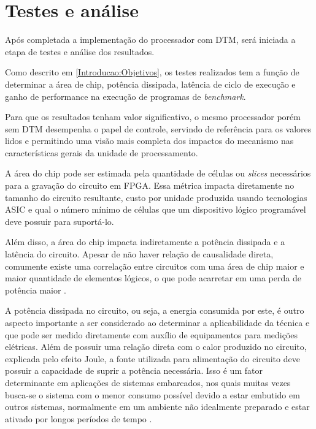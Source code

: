 \section{Testes e análise}
\label{Metodologia:Analise}

Após completada a implementação do processador com DTM, será iniciada a etapa de testes e análise dos resultados. 


Como descrito em \ref{Introducao:Objetivos}, os testes realizados tem a função de determinar a área de chip, potência dissipada, latência de ciclo de execução e ganho de performance na execução de programas de \textit{benchmark}. %

Para que os resultados tenham valor significativo, o mesmo processador porém sem DTM desempenha o papel de controle, servindo de referência para os valores lidos e permitindo uma visão mais completa dos impactos do mecanismo nas características gerais da unidade de processamento.

A área do chip pode ser estimada pela quantidade de células ou \textit{slices} necessários para a gravação do circuito em FPGA. Essa métrica impacta diretamente no tamanho do circuito resultante, custo por unidade produzida usando tecnologias ASIC e qual o número mínimo de células que um dispositivo lógico programável deve possuir para suportá-lo.

Além disso, a área do chip impacta indiretamente a potência dissipada e a latência do circuito. Apesar de não haver relação de causalidade direta, comumente existe uma correlação entre circuitos com uma área de chip maior e maior quantidade de elementos lógicos, o que pode acarretar em uma perda de potência maior \cite{chu2006rtl}.

A potência dissipada no circuito, ou seja, a energia consumida por este, é outro aspecto importante a ser considerado ao determinar a aplicabilidade da técnica e que pode ser medido diretamente com auxílio de equipamentos para medições elétricas. Além de possuir uma relação direta com o calor produzido no circuito, explicada pelo efeito Joule, a fonte utilizada para alimentação do circuito deve possuir a capacidade de suprir a potência necessária. Isso é um fator determinante em aplicações de sistemas embarcados, nos quais muitas vezes busca-se o sistema com o menor consumo possível devido a estar embutido em outros sistemas, normalmente em um ambiente não idealmente preparado e estar ativado por longos períodos de tempo \cite{tanenbaum2009organizacao}.

